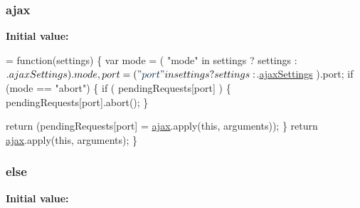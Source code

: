 \subsubsection[{ajax}]{\setlength{\rightskip}{0pt plus 5cm}ajax}\label{packages_2j_query_8_validation_81_811_81_2_content_2_scripts_2jquery_8validate-vsdoc_8js_a77004c0fdc08a5bc07afa0b099cdf6df}
{\bfseries Initial value\+:}
\begin{DoxyCode}
= \textcolor{keyword}{function}(settings) \{
            var mode = ( \textcolor{stringliteral}{"mode"} in settings ? settings : $.ajaxSettings ).mode,
                port = ( \textcolor{stringliteral}{"port"} in settings ? settings : $.\hyperlink{jquery-1_810_82-vsdoc_8js_adcbb4ce9148aaf3a9a165b2ac462163b}{ajaxSettings} ).port;
            \textcolor{keywordflow}{if} (mode == \textcolor{stringliteral}{"abort"}) \{
                \textcolor{keywordflow}{if} ( pendingRequests[port] ) \{
                    pendingRequests[port].abort();
                \}

                \textcolor{keywordflow}{return} (pendingRequests[port] = \hyperlink{_bibabook_2_scripts_2jquery_8validate-vsdoc_8js_a77004c0fdc08a5bc07afa0b099cdf6df}{ajax}.apply(\textcolor{keyword}{this}, arguments));
            \}
            \textcolor{keywordflow}{return} \hyperlink{_bibabook_2_scripts_2jquery_8validate-vsdoc_8js_a77004c0fdc08a5bc07afa0b099cdf6df}{ajax}.apply(\textcolor{keyword}{this}, arguments);
        \}
\end{DoxyCode}
\hypertarget{packages_2j_query_8_validation_81_811_81_2_content_2_scripts_2jquery_8validate-vsdoc_8js_a0544c3fe466e421738dae463968b70ba}{}
\subsubsection[{else}]{\setlength{\rightskip}{0pt plus 5cm}else}\label{packages_2j_query_8_validation_81_811_81_2_content_2_scripts_2jquery_8validate-vsdoc_8js_a0544c3fe466e421738dae463968b70ba}
{\bfseries Initial value\+:}
\hypertarget{packages_2j_query_8_validation_81_811_81_2_content_2_scripts_2jquery_8validate-vsdoc_8js_a387137c43ed9616d39ba90e890d181eb}{}
